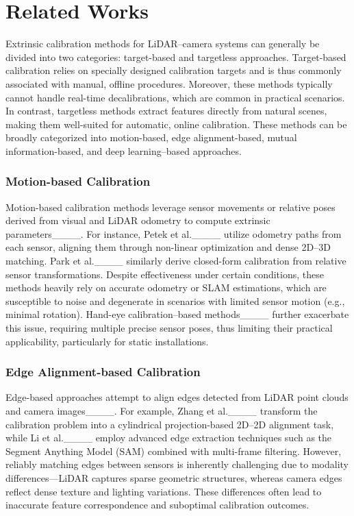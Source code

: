 \section{Related Works}
Extrinsic calibration methods for LiDAR–camera systems can generally be divided into two categories: target-based and targetless approaches. Target-based calibration relies on specially designed calibration targets and is thus commonly associated with manual, offline procedures. Moreover, these methods typically cannot handle real-time decalibrations, which are common in practical scenarios. In contrast, targetless methods extract features directly from natural scenes, making them well-suited for automatic, online calibration.
These methods can be broadly categorized into motion-based, edge alignment-based, mutual information-based, and deep learning–based approaches.

\subsubsection{Motion-based Calibration}
Motion-based calibration methods leverage sensor movements or relative poses derived from visual and LiDAR odometry to compute extrinsic parameters____. For instance, Petek et al.____ utilize odometry paths from each sensor, aligning them through non-linear optimization and dense 2D–3D matching. Park et al.____ similarly derive closed-form calibration from relative sensor transformations. Despite effectiveness under certain conditions, these methods heavily rely on accurate odometry or SLAM estimations, which are susceptible to noise and degenerate in scenarios with limited sensor motion (e.g., minimal rotation). Hand-eye calibration–based methods____ further exacerbate this issue, requiring multiple precise sensor poses, thus limiting their practical applicability, particularly for static installations.

\subsubsection{Edge Alignment-based Calibration}
Edge-based approaches attempt to align edges detected from LiDAR point clouds and camera images____. For example, Zhang et al.____ transform the calibration problem into a cylindrical projection-based 2D–2D alignment task, while Li et al.____ employ advanced edge extraction techniques such as the Segment Anything Model (SAM) combined with multi-frame filtering. However, reliably matching edges between sensors is inherently challenging due to modality differences—LiDAR captures sparse geometric structures, whereas camera edges reflect dense texture and lighting variations. These differences often lead to inaccurate feature correspondence and suboptimal calibration outcomes.

